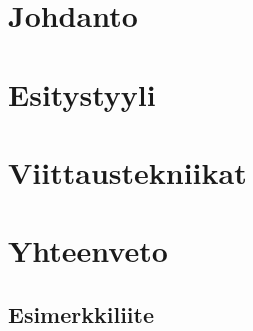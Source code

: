 \documentclass{tauthesis}
\theoremstyle{definition}
\begin{document}

\listoffigures
\listoftables
\lstlistoflistings


\glossary


\mainmatter

\chapter{Johdanto}
\label{ch:johdanto}


\chapter{Esitystyyli}
\label{ch:esitystyyli}


\chapter{Viittaustekniikat}
\label{ch:viittaustekniikat}



\chapter{Yhteenveto}
\label{ch:yhteenveto}



\printbibliography[heading=bibintoc]



\begin{appendices}

\chapter{Esimerkkiliite}
\label{ch:liite}


\end{appendices}
\end{document}
